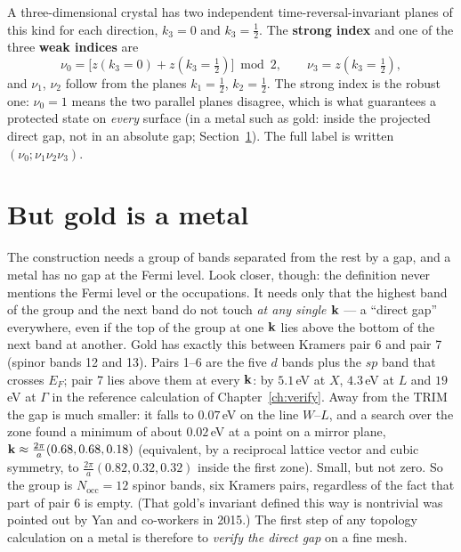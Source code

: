A three-dimensional crystal has two independent time-reversal-invariant
planes of this kind for each direction, $k_3 = 0$ and $k_3 = \tfrac12$.
The \textbf{strong index} and one of the three \textbf{weak indices} are
\begin{equation}
\nu_0 = \big[z(k_3{=}0) + z(k_3{=}\tfrac12)\big] \bmod 2,
\qquad
\nu_3 = z(k_3{=}\tfrac12),
\label{eq:nu0fromz}
\end{equation}
and $\nu_1$, $\nu_2$ follow from the planes $k_1 = \tfrac12$,
$k_2 = \tfrac12$. The strong index is the robust one: $\nu_0 = 1$ means
the two parallel planes disagree, which is what guarantees a protected
state on \emph{every} surface (in a metal such as gold: inside the
projected direct gap, not in an absolute gap;
Section~\ref{sec:directgap}). The full label is written
$(\nu_0;\nu_1\nu_2\nu_3)$.

\section{But gold is a metal}
\label{sec:directgap}

The construction needs a group of bands separated from the rest by a gap,
and a metal has no gap at the Fermi level. Look closer, though: the
definition never mentions the Fermi level or the occupations. It needs
only that the highest band of the group and the next band do not touch
\emph{at any single $\mathbf{k}$} --- a ``direct gap'' everywhere, even if the
top of the group at one $\mathbf{k}$ lies above the bottom of the next band at
another. Gold has exactly this between Kramers pair 6 and pair 7 (spinor
bands 12 and 13). Pairs 1--6 are the five $d$ bands plus the $sp$ band
that crosses $E_F$; pair 7 lies above them at every $\mathbf{k}$:
by $5.1$\,eV at $X$, $4.3$\,eV at $L$ and $19$\,eV at $\Gamma$ in the
reference calculation of Chapter~\ref{ch:verify}. Away from the TRIM the
gap is much smaller: it falls to $0.07$\,eV on the line $W$--$L$, and a
search over the zone found a minimum of about $0.02$\,eV at a point on a
mirror plane, $\mathbf{k} \approx \tfrac{2\pi}{a}(0.68, 0.68, 0.18)$ (equivalent,
by a reciprocal lattice vector and cubic symmetry, to
$\tfrac{2\pi}{a}(0.82, 0.32, 0.32)$ inside the first zone). Small, but
not zero.
So the group is $N_{\mathrm{occ}} = 12$ spinor bands, six Kramers pairs,
regardless of the fact that part of pair 6 is empty. (That gold's
invariant defined this way is nontrivial was pointed out by Yan and
co-workers in 2015.) The first step of any topology calculation on a metal
is therefore to \emph{verify the direct gap} on a fine mesh.

